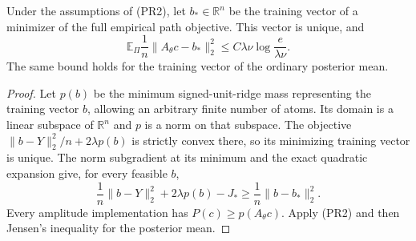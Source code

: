 \begin{corollary}
Under the assumptions of (PR2), let $b_*\in\mathbb R^n$ be the
training vector of a minimizer of the full empirical path objective.
This vector is unique, and
\[
 \mathbb E_\Pi\frac1n\|A_\theta c-b_*\|_2^2
 \le C\lambda\nu\log\frac e{\lambda\nu}. \tag{PR4}
\]
The same bound holds for the training vector of the ordinary
posterior mean.
\end{corollary}
\begin{proof}
Let $p(b)$ be the minimum signed-unit-ridge mass representing the
training vector $b$, allowing an arbitrary finite number of atoms.
Its domain is a linear subspace of $\mathbb R^n$ and $p$ is a norm
on that subspace. The objective
$\|b-Y\|_2^2/n+2\lambda p(b)$ is strictly convex there, so its
minimizing training vector is unique. The norm subgradient at its
minimum and the exact quadratic expansion give, for every feasible $b$,
\[
 \frac1n\|b-Y\|_2^2+2\lambda p(b)-J_*
 \ge\frac1n\|b-b_*\|_2^2.
\]
Every amplitude implementation has $P(c)\ge p(A_\theta c)$.
Apply (PR2) and then Jensen's inequality for the posterior mean.
\end{proof}
